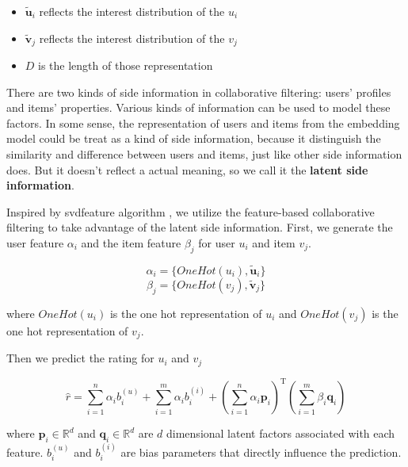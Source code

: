 \documentclass{sig-alternate-05-2015}
\begin{document}
\begin{itemize}
	\item $\tilde{\mathbf{u}}_i$ reflects the interest distribution of the $u_i$
	\item $\tilde{\mathbf{v}}_j$ reflects the interest distribution of the $v_j$
	\item $D$ is the length of those representation
\end{itemize}

There are two kinds of side information in collaborative filtering:
users' profiles and items' properties.
Various kinds of information can be used to model these factors.
In some sense, the representation of users and items from the embedding model
could be treat as a kind of side information,
because it distinguish the similarity and difference between users and items,
just like other side information does.
But it doesn't reflect a actual meaning, so we call it the \textbf{latent side information}. 

Inspired by svdfeature algorithm \cite{chen2012svdfeature}, we utilize the feature-based
collaborative filtering to take advantage of the latent side information.
First, we generate the user feature $\alpha_{i}$ and the item feature $\beta_{j}$
for user $u_i$ and item $v_j$.

\begin{equation}
\alpha_{i} = \{ OneHot(u_i), \tilde{\mathbf{u}}_i \}
\end{equation}
\begin{equation}
\beta_{j} = \{OneHot(v_j), \tilde{\mathbf{v}}_j \}
\end{equation}

where $OneHot(u_i)$ is the one hot representation of $u_i$
and $OneHot(v_j)$ is the one hot representation of $v_j$.

Then we predict the rating for $u_i$ and $v_j$

\begin{equation}
\hat{r} = \sum_{i=1}^{n} \alpha_{i} b_{i}^{(u)} + \sum_{i=1}^{m} \alpha_{i} b_{i}^{(i)} +
\left( \sum_{i=1}^{n} \alpha_{i} \textbf{p}_{i} \right) ^ \mathrm{T}
\left( \sum_{i=1}^{m} \beta_{i} \textbf{q}_{i} \right)
\end{equation}

where $\textbf{p}_{i} \in \mathbb{R}^d$ and $\textbf{q}_{i} \in \mathbb{R}^d$
are $d$ dimensional latent factors associated with each feature.
$b_{i}^{(u)}$ and $b_{i}^{(i)}$ are bias parameters that directly influence the prediction.
\end{document}
